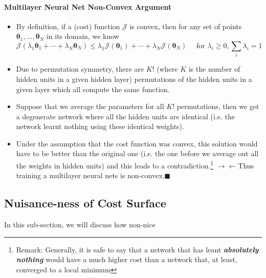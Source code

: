 \documentclass[11pt]{article}
\newcommand{\contradiction}{$\longrightarrow\!\longleftarrow$}
\newcommand{\qed}{\hfill $\blacksquare$}
\begin{document}
\paragraph{Multilayer Neural Net Non-Convex Argument}
\begin{itemize}
    \item By definition, if a (cost) function $\mathcal{J}$ is convex, then for any set of points $\boldsymbol{\theta}_{1}, \dots, \boldsymbol{\theta}_{N}$ in its domain, we know
    \begin{equation}
        \mathcal{J}\left(\lambda_{1} \boldsymbol{\theta}_{1}+\cdots+\lambda_{N} \boldsymbol{\theta}_{N}\right) \leq \lambda_{1} \mathcal{J}\left(\boldsymbol{\theta}_{1}\right)+\cdots+\lambda_{N} \mathcal{J}\left(\boldsymbol{\theta}_{N}\right) \quad \text { for } \lambda_{i} \geq 0, \sum_{i} \lambda_{i}=1
    \end{equation}
    \item Due to permutation symmetry, there are $K!$ (where $K$ is the number of hidden units in a given hidden layer) permutations of the hidden units in a given layer which all compute the same function. 
    \item Suppose that we average the parameters for all $K!$ permutations, then we get a degenerate network where all the hidden units are identical (i.e. the network learnt nothing using these identical weights).
    \item Under the assumption that the cost function was convex, this solution would have to be better than the original one (i.e. the one before we average out all the weights in hidden units) and this leads to a contradiction.\footnote{Remark: Generally, it is safe to say that a network that has leant\textit{\textbf{ absolutely nothing }}would have a much higher cost than a network that, at least, converged to a local minimum} \contradiction Thus training a multilayer neural nets is non-convex.\qed
\end{itemize}

\subsection{Nuisance-ness of Cost Surface}
In this sub-section, we will discuss how non-nice 
\end{document}
